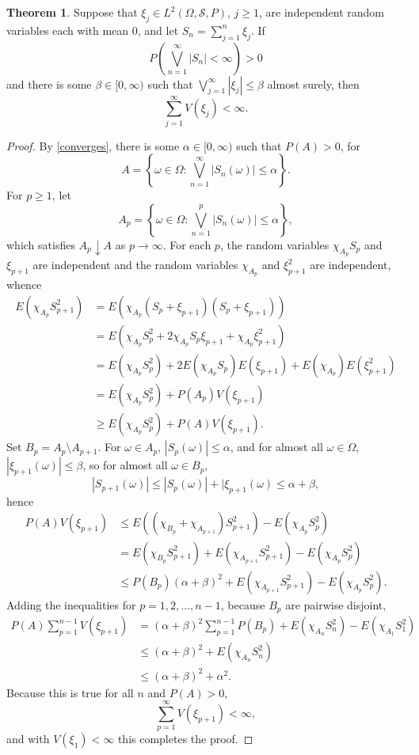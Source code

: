 \documentclass{article}
\theoremstyle{definition}
\newtheorem{theorem}{Theorem}
\theoremstyle{definition}
\begin{document}
\begin{theorem}
Suppose that $\xi_j \in L^2(\Omega,\mathscr{S},P)$, $j \geq 1$, are independent  random variables
each with mean $0$, and let
$S_n=\sum_{j=1}^n \xi_j$.
 If 
 \begin{equation}
P\left( \bigvee_{n=1}^\infty |S_n|<\infty \right)>0
\label{converges}
\end{equation}
and
 there is some $\beta \in [0,\infty)$ such that
$\bigvee_{j=1}^\infty |\xi_j| \leq \beta$ almost surely, then 
\[
\sum_{j=1}^\infty V(\xi_j)<\infty.
\]
\end{theorem}
\begin{proof}
By \eqref{converges}, there is some $\alpha \in [0,\infty)$ such that $P(A)>0$, for
\[
A = \left\{ \omega \in \Omega: \bigvee_{n=1}^\infty |S_n(\omega)| \leq \alpha \right\}.
\]
For $p \geq 1$, let
\[
A_p = \left\{ \omega \in \Omega: \bigvee_{n=1}^p |S_n(\omega)| \leq \alpha \right\},
\]
which satisfies $A_p \downarrow A$ as $p \to \infty$. For each $p$, the random variables
$\chi_{A_p} S_p$ and $\xi_{p+1}$ are independent and the random variables
$\chi_{A_p}$ and $\xi_{p+1}^2$ are independent,
whence
\begin{align*}
E(\chi_{A_p} S_{p+1}^2)&=E(\chi_{A_p} (S_p+\xi_{p+1})(S_p+\xi_{p+1}))\\
&=E(\chi_{A_p} S_p^2+2\chi_{A_p} S_p \xi_{p+1} + \chi_{A_p} \xi_{p+1}^2)\\
&=E(\chi_{A_p} S_p^2) + 2 E(\chi_{A_p} S_p) E(\xi_{p+1})+E(\chi_{A_p}) E(\xi_{p+1}^2)\\
&=E(\chi_{A_p} S_p^2) + P(A_p) V(\xi_{p+1})\\
&\geq E(\chi_{A_p} S_p^2) + P(A) V(\xi_{p+1}).
\end{align*}
Set $B_p = A_p \setminus A_{p+1}$. For $\omega \in A_p$, $|S_p(\omega)| \leq \alpha$, and for almost
all $\omega \in \Omega$, $|\xi_{p+1}(\omega)| \leq \beta$, so for almost all $\omega 
\in B_p$,
\[
|S_{p+1}(\omega)| \leq |S_p(\omega)| + |\xi_{p+1}(\omega) \leq \alpha+\beta,
\]
hence
\begin{align*}
P(A)V(\xi_{p+1})&\leq E((\chi_{B_p}+\chi_{A_{p+1}}) S_{p+1}^2) - E(\chi_{A_p} S_p^2)\\
&=E(\chi_{B_p} S_{p+1}^2)+E(\chi_{A_{p+1}}S_{p+1}^2)- E(\chi_{A_p} S_p^2)\\
&\leq P(B_p) (\alpha+\beta)^2 + E(\chi_{A_{p+1}}S_{p+1}^2)- E(\chi_{A_p} S_p^2).
\end{align*}
Adding the inequalities for $p=1,2,\ldots,n-1$, because $B_p$ are pairwise disjoint,
\begin{align*}
P(A) \sum_{p=1}^{n-1} V(\xi_{p+1})&= (\alpha+\beta)^2 \sum_{p=1}^{n-1} P(B_p) + E(\chi_{A_n} S_n^2) - 
E(\chi_{A_1} S_1^2)\\
&\leq (\alpha+\beta)^2 + E(\chi_{A_n} S_n^2)\\
&\leq (\alpha+\beta)^2 + \alpha^2.
\end{align*}
Because this is true for all $n$ and $P(A)>0$,
\[
\sum_{p=1}^\infty V(\xi_{p+1}) < \infty,
\]
and with $V(\xi_1)<\infty$ this completes the proof.
\end{proof}
\end{document}
